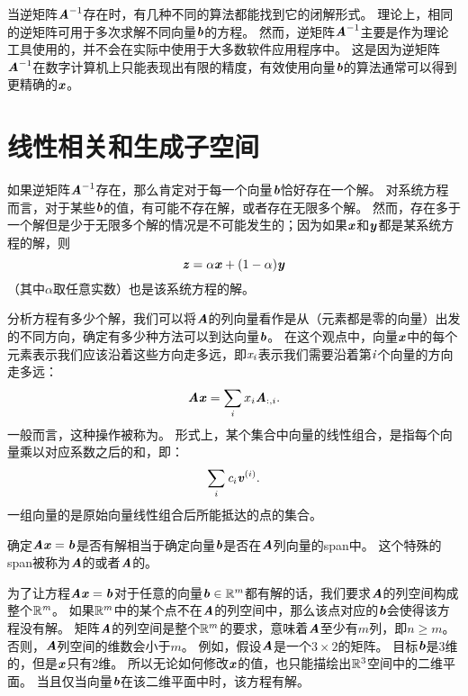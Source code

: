 当逆矩阵$\MA^{-1}$存在时，有几种不同的算法都能找到它的闭解形式。
理论上，相同的逆矩阵可用于多次求解不同向量$\Vb$的方程。
然而，逆矩阵$\MA^{-1}$主要是作为理论工具使用的，并不会在实际中使用于大多数软件应用程序中。
这是因为逆矩阵$\MA^{-1}$在数字计算机上只能表现出有限的精度，有效使用向量$\Vb$的算法通常可以得到更精确的$\Vx$。





\section{线性相关和生成子空间}
\label{sec:linear_dependence_and_span}

如果逆矩阵$\MA^{-1}$存在，那么肯定对于每一个向量$\Vb$恰好存在一个解。
对系统方程而言，对于某些$\Vb$的值，有可能不存在解，或者存在无限多个解。
然而，存在多于一个解但是少于无限多个解的情况是不可能发生的；因为如果$\Vx$和$\Vy$都是某系统方程的解，则
\begin{equation}
\Vz=\alpha \Vx + (1-\alpha) \Vy
\end{equation}
（其中$\alpha$取任意实数）也是该系统方程的解。


分析方程有多少个解，我们可以将$\MA$的列向量看作是从（元素都是零的向量）出发的不同方向，确定有多少种方法可以到达向量$\Vb$。
在这个观点中，向量$\Vx$中的每个元素表示我们应该沿着这些方向走多远，即$\Sx_{\Si}$表示我们需要沿着第$\Si$个向量的方向走多远：
\begin{equation}
\MA \Vx = \sum_i x_i \MA_{:,i}.
\end{equation}
一般而言，这种操作被称为。
形式上，某个集合中向量的线性组合，是指每个向量乘以对应系数之后的和，即：
\begin{equation}
    \sum_i \Sc_i \Vv^{(i)}.
\end{equation}
一组向量的是原始向量线性组合后所能抵达的点的集合。


确定$\MA\Vx=\Vb$是否有解相当于确定向量$\Vb$是否在$\MA$列向量的\gls{span}中。
这个特殊的\gls{span}被称为$\MA$的或者$\MA$的。


为了让方程$\MA \Vx=\Vb$对于任意的向量$\Vb \in \SetR^m$都有解的话，我们要求$\MA$的列空间构成整个$\SetR^{\Sm}$。
如果$\SetR^m$中的某个点不在$\MA$的列空间中，那么该点对应的$\Vb$会使得该方程没有解。
矩阵$\MA$的列空间是整个$\SetR^m$的要求，意味着$\MA$至少有$m$列，即$n\geq m$。
否则，$\MA$列空间的维数会小于$m$。
例如，假设$\MA$是一个$3\times 2$的矩阵。
目标$\Vb$是$3$维的，但是$\Vx$只有$2$维。
所以无论如何修改$\Vx$的值，也只能描绘出$\SetR^3$空间中的二维平面。
当且仅当向量$\Vb$在该二维平面中时，该方程有解。




